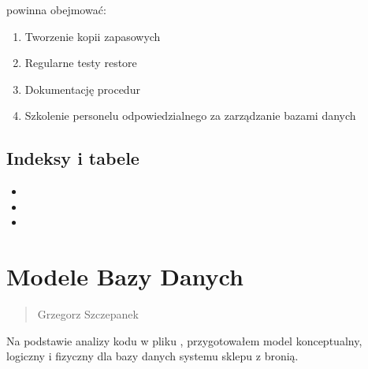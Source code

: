 \documentclass[letterpaper,10pt,polish]{sphinxmanual}
\begin{document}
\sphinxAtStartPar
{} powinna obejmować:
\begin{enumerate}
%
\item {} 
\sphinxAtStartPar
Tworzenie kopii zapasowych

\item {} 
\sphinxAtStartPar
Regularne testy restore

\item {} 
\sphinxAtStartPar
Dokumentację procedur

\item {} 
\sphinxAtStartPar
Szkolenie personelu odpowiedzialnego za zarządzanie bazami danych

\end{enumerate}


\section{Indeksy i tabele}
\label{\detokenize{rozdzial2/Kopie_zapasowe_i_odzyskiwanie_danych/index:indeksy-i-tabele}}\begin{itemize}
\item {} 
\sphinxAtStartPar
{}

\item {} 
\sphinxAtStartPar
{}

\item {} 
\sphinxAtStartPar
{}

\end{itemize}

\sphinxstepscope


\chapter{Modele Bazy Danych}
\label{\detokenize{rozdzial3/index:modele-bazy-danych}}\label{\detokenize{rozdzial3/index::doc}}\begin{quote}\begin{description}
\sphinxAtStartPar
Grzegorz Szczepanek

\end{description}\end{quote}

\sphinxAtStartPar
Na podstawie analizy kodu w pliku , przygotowałem model konceptualny, logiczny i fizyczny dla bazy danych systemu sklepu z bronią.
\end{document}
